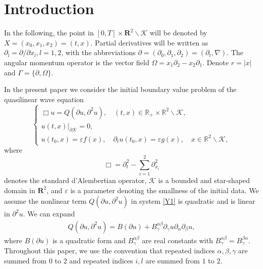 \documentclass[11pt, reqno]{amsart}
\theoremstyle{definition}
\theoremstyle{remark}
\theoremstyle{definition}
\numberwithin{equation}{section}
\newcommand{\e}{\varepsilon}
\newcommand{\R}{\mathbf{R}}
\numberwithin{equation}{section}
\begin{document}
\maketitle

\section{Introduction}%





In the following, the point in $[0, T]\times \R^2\backslash \mathcal {K}$ will be denoted by $X=(x_0,x_1,x_2)=(t,x)$.
Partial derivatives will be written as $\partial_l=\partial/\partial
x_l,l=1,2$, with the abbreviations
$\partial=(\partial_0,\partial_1,\partial_2)=(\partial_t,\nabla)$.
The angular momentum operator is the vector field
$\Omega=x_1\partial_2-x_2\partial_1$. Denote $r=|x|$ and
$\Gamma=\{\partial,\Omega\}$.
\par In the present paper we consider the initial boundary value problem of the quasilinear wave equation
\begin{equation}\label{Y1}
\left \{
\begin{array}{lllll}
\Box u=Q(\partial u,\partial^2u),\quad (t,x)\in\mathbb
R_{+}\times \mathbb
R^2\backslash\mathcal {K}, \\
u(t,x)|_{\partial\mathcal {K}}=0,\\
u(t_0,x)=\e f(x),\quad \partial_tu(t_0,x)=\e g(x),\quad x\in\mathbb
R^2\backslash\mathcal {K},
\end{array} \right.
\end{equation}
where
\[
\Box=\partial_t^2-\sum_{i=1}^{2}\partial_{x_i}^2
\]
denotes the standard d'Alembertian operator, $\mathcal {K}$ is a bounded  and star-shaped domain in $\R^2$, and $\e$ is a parameter denoting the smallness of 
the initial data. We assume the nonlinear term $Q(\partial u,\partial^2u)$ in system
\eqref{Y1} is quadratic and is linear in $\partial^2u$. We can
expand
\begin{align*}
Q(\partial u,\partial^2u)=B(\partial
u)+B_{\gamma}^{\alpha\beta}\partial_{\gamma}u\partial_{\alpha}\partial_{\beta}u,
\end{align*}
where $B(\partial u)$ is a quadratic form and
$B_{\gamma}^{\alpha\beta}$ are real constants with
$B_{\gamma}^{\alpha\beta}=B_{\gamma}^{\beta\alpha}$. Throughout this
paper, we use the convention that repeated indices
$\alpha,\beta,\gamma$ are summed from $0$ to $2$ and repeated
indices $i,l$ are summed from $1$ to $2$.
\par
\end{document}
